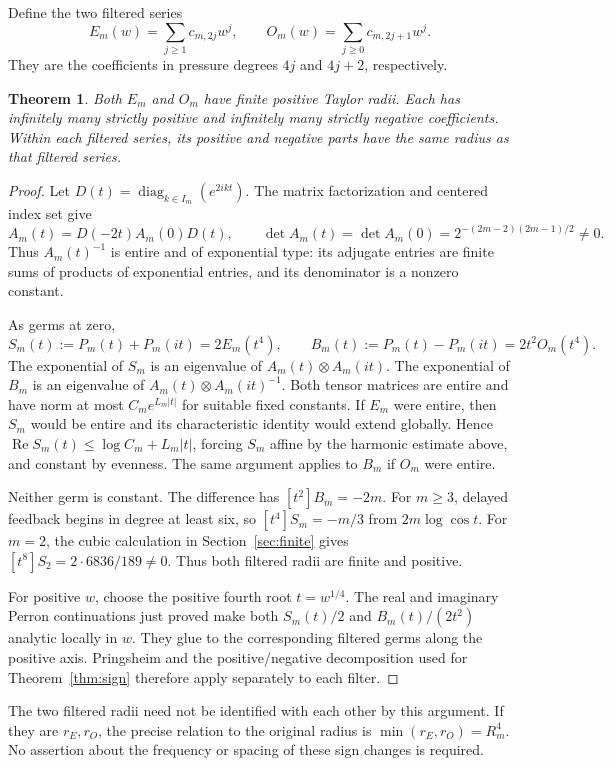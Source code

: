 \documentclass[11pt,a4paper]{article}
\newtheorem{theorem}{Theorem}[section]\newtheorem{lemma}[theorem]{Lemma}
\theoremstyle{remark}\newtheorem*{ednote}{Editorial note (ProveIt, 2026-10-01)}
\begin{document}
Define the two filtered series
\[
 E_m(w)=\sum_{j\ge1}c_{m,2j}w^j,\qquad
 O_m(w)=\sum_{j\ge0}c_{m,2j+1}w^j.
\]
They are the coefficients in pressure degrees $4j$ and $4j+2$, respectively.
\begin{theorem}\label{thm:filters}
Both $E_m$ and $O_m$ have finite positive Taylor radii.
Each has infinitely many strictly positive and infinitely many strictly negative coefficients.
Within each filtered series, its positive and negative parts have the same radius as that filtered series.
\end{theorem}
\begin{proof}
Let $D(t)=\operatorname{diag}_{k\in I_m}(e^{2ikt})$.
The matrix factorization and centered index set give
\[
 A_m(t)=D(-2t)A_m(0)D(t),\qquad
 \det A_m(t)=\det A_m(0)=2^{-(2m-2)(2m-1)/2}\ne0.
\]
Thus $A_m(t)^{-1}$ is entire and of exponential type: its adjugate entries are finite sums of products of exponential entries, and its denominator is a nonzero constant.

As germs at zero,
\[
 S_m(t):=P_m(t)+P_m(it)=2E_m(t^4),\qquad
 B_m(t):=P_m(t)-P_m(it)=2t^2O_m(t^4).
\]
The exponential of $S_m$ is an eigenvalue of $A_m(t)\otimes A_m(it)$.
The exponential of $B_m$ is an eigenvalue of $A_m(t)\otimes A_m(it)^{-1}$.
Both tensor matrices are entire and have norm at most $C_m e^{L_m|t|}$ for suitable fixed constants.
If $E_m$ were entire, then $S_m$ would be entire and its characteristic identity would extend globally.
Hence $\operatorname{Re}S_m(t)\le\log C_m+L_m|t|$, forcing $S_m$ affine by the harmonic estimate above, and constant by evenness.
The same argument applies to $B_m$ if $O_m$ were entire.

Neither germ is constant.
The difference has $[t^2]B_m=-2m$.
For $m\ge3$, delayed feedback begins in degree at least six, so
$[t^4]S_m=-m/3$ from $2m\log\cos t$.
For $m=2$, the cubic calculation in Section~\ref{sec:finite} gives
$[t^8]S_2=2\cdot6836/189\ne0$.
Thus both filtered radii are finite and positive.

For positive $w$, choose the positive fourth root $t=w^{1/4}$.
The real and imaginary Perron continuations just proved make both
$S_m(t)/2$ and $B_m(t)/(2t^2)$ analytic locally in $w$.
They glue to the corresponding filtered germs along the positive axis.
Pringsheim and the positive/negative decomposition used for Theorem~\ref{thm:sign} therefore apply separately to each filter.
\end{proof}
The two filtered radii need not be identified with each other by this argument.
If they are $r_E,r_O$, the precise relation to the original radius is
$\min(r_E,r_O)=R_m^4$.
No assertion about the frequency or spacing of these sign changes is required.
\end{document}

